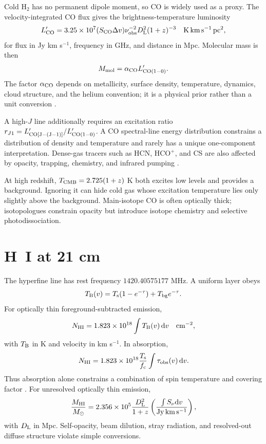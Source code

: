 Cold H$_2$ has no permanent dipole moment, so CO is widely used as a proxy.
The velocity-integrated CO flux gives the brightness-temperature luminosity
\begin{equation}
 L'_{\rm CO}=3.25\times10^7
 (S_{\rm CO}\Delta v)\nu_{\rm obs}^{-2}D_{\rm L}^{2}(1+z)^{-3}
 \quad {\rm K\,km\,s^{-1}\,pc^2},
\end{equation}
for flux in Jy km s$^{-1}$, frequency in GHz, and distance in Mpc. Molecular
mass is then
\begin{equation}
 M_{\rm mol}=\alpha_{\rm CO}L'_{\rm CO(1-0)}.
\end{equation}
The factor $\alpha_{\rm CO}$ depends on metallicity, surface density,
temperature, dynamics, cloud structure, and the helium convention; it is a
physical prior rather than a unit conversion \citep{Bolatto2013}.

A high-$J$ line additionally requires an excitation ratio
$r_{J1}=L'_{\rm CO[J-(J-1)]}/L'_{\rm CO(1-0)}$. A CO spectral-line energy
distribution constrains a distribution of density and temperature and rarely
has a unique one-component interpretation. Dense-gas tracers such as HCN,
HCO$^+$, and CS are also affected by opacity, trapping, chemistry, and
infrared pumping \citep{CarilliWalter2013}.

At high redshift, $T_{\rm CMB}=2.725(1+z)$ K both excites low levels and
provides a background. Ignoring it can hide cold gas whose excitation
temperature lies only slightly above the background. Main-isotope CO is
often optically thick; isotopologues constrain opacity but introduce isotope
chemistry and selective photodissociation.

\section{H~I at 21 cm}

The hyperfine line has rest frequency $1420.40575177$ MHz. A uniform layer
obeys
\begin{equation}
 T_{\rm B}(v)=T_{\rm s}(1-e^{-\tau})+T_{\rm bg}e^{-\tau}.
\end{equation}
For optically thin foreground-subtracted emission,
\begin{equation}
 N_{\rm HI}=1.823\times10^{18}\int T_{\rm B}(v)\,{\rm d}v
 \quad {\rm cm^{-2}},
\end{equation}
with $T_{\rm B}$ in K and velocity in km s$^{-1}$. In absorption,
\begin{equation}
 N_{\rm HI}=1.823\times10^{18}\frac{T_{\rm s}}{f_{\rm c}}
 \int\tau_{\rm obs}(v)\,{\rm d}v .
\end{equation}
Thus absorption alone constrains a combination of spin temperature and
covering factor \citep{Chengalur2013}. For unresolved optically thin emission,
\begin{equation}
 \frac{M_{\rm HI}}{M_\odot}=2.356\times10^5
 \frac{D_{\rm L}^2}{1+z}
 \left(\frac{\int S_\nu{\rm d}v}{\mathrm{Jy\,km\,s^{-1}}}\right),
\end{equation}
with $D_{\rm L}$ in Mpc. Self-opacity, beam dilution, stray radiation, and
resolved-out diffuse structure violate simple conversions.

